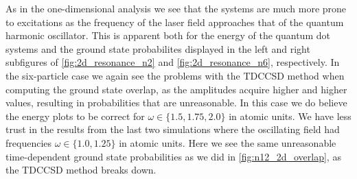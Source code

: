 As in the one-dimensional analysis we see that the systems are much more prone to 
excitations as the frequency of the laser field approaches that of the quantum harmonic 
oscillator. This is apparent both for the energy of the quantum dot systems and the 
ground state probabilites displayed in the left and right subfigures of
\autoref{fig:2d_resonance_n2} and \autoref{fig:2d_resonance_n6}, respectively. In the 
six-particle case we again see the problems with the TDCCSD method when computing the 
ground state overlap, as the amplitudes acquire higher and higher values, resulting 
in probabilities that are unreasonable. In this case we do believe the 
energy plots to be correct for $\omega\in\{1.5, 1.75,2.0\}$ in atomic units. 
We have less trust in the results from the last two simulations where the oscillating 
field had frequencies $\omega\in\{1.0, 1.25\}$ in atomic units.
Here we see the same unreasonable time-dependent 
ground state probabilities as we did in \autoref{fig:n12_2d_overlap}, as the 
TDCCSD method breaks down.

